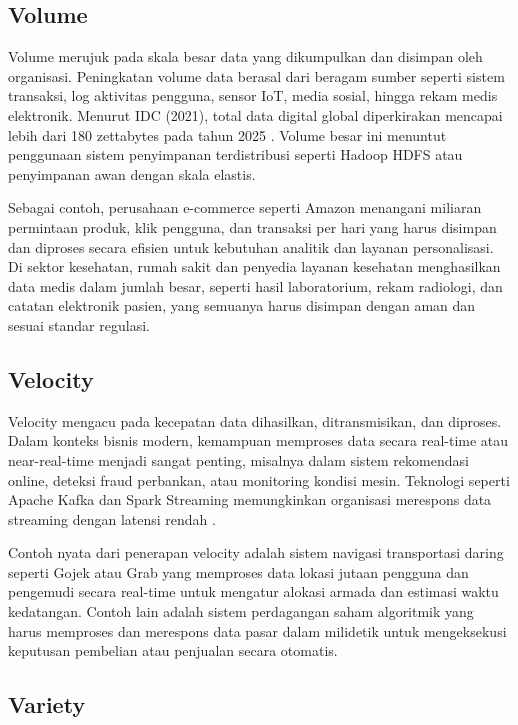 \subsection{Volume}

Volume merujuk pada skala besar data yang dikumpulkan dan disimpan oleh organisasi. Peningkatan volume data berasal dari beragam sumber seperti sistem transaksi, log aktivitas pengguna, sensor IoT, media sosial, hingga rekam medis elektronik. Menurut IDC (2021), total data digital global diperkirakan mencapai lebih dari 180 zettabytes pada tahun 2025 \cite{idc2021}. Volume besar ini menuntut penggunaan sistem penyimpanan terdistribusi seperti Hadoop HDFS atau penyimpanan awan dengan skala elastis.

Sebagai contoh, perusahaan e-commerce seperti Amazon menangani miliaran permintaan produk, klik pengguna, dan transaksi per hari yang harus disimpan dan diproses secara efisien untuk kebutuhan analitik dan layanan personalisasi. Di sektor kesehatan, rumah sakit dan penyedia layanan kesehatan menghasilkan data medis dalam jumlah besar, seperti hasil laboratorium, rekam radiologi, dan catatan elektronik pasien, yang semuanya harus disimpan dengan aman dan sesuai standar regulasi.

\subsection{Velocity}

Velocity mengacu pada kecepatan data dihasilkan, ditransmisikan, dan diproses. Dalam konteks bisnis modern, kemampuan memproses data secara real-time atau near-real-time menjadi sangat penting, misalnya dalam sistem rekomendasi online, deteksi fraud perbankan, atau monitoring kondisi mesin. Teknologi seperti Apache Kafka dan Spark Streaming memungkinkan organisasi merespons data streaming dengan latensi rendah \cite{demchenko2013}.

Contoh nyata dari penerapan velocity adalah sistem navigasi transportasi daring seperti Gojek atau Grab yang memproses data lokasi jutaan pengguna dan pengemudi secara real-time untuk mengatur alokasi armada dan estimasi waktu kedatangan. Contoh lain adalah sistem perdagangan saham algoritmik yang harus memproses dan merespons data pasar dalam milidetik untuk mengeksekusi keputusan pembelian atau penjualan secara otomatis.


\subsection{Variety}

